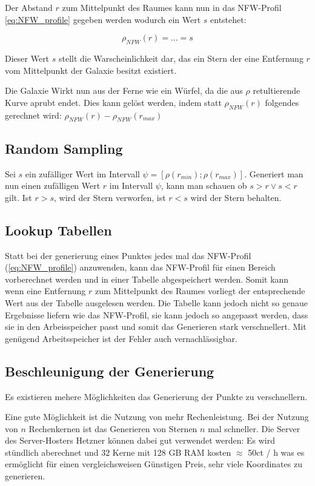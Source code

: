 \documentclass[a4paper, 10pt]{article}
\begin{document}
\begin{multicols*}{2}
Der Abstand \( r \) zum Mittelpunkt des Raumes kann nun in das NFW-Profil
\ref{eq:NFW_profile} gegeben werden wodurch ein Wert \( s \) entstehet:

\begin{equation}
\rho_{NFW}(r) = \dots = s
\end{equation}

Dieser Wert \( s \) stellt die Warscheinlichkeit dar, das ein Stern der
eine Entfernung \( r \) vom Mittelpunkt der Galaxie besitzt existiert.

Die Galaxie Wirkt nun aus der Ferne wie ein Würfel, da die aus \( \rho \)
retultierende Kurve aprubt endet. Dies kann gelöst werden, indem statt \(
\rho_{NFW}(r) \) folgendes gerechnet wird: \( \rho_{NFW}(r) -
\rho_{NFW}(r_{max}) \) 

\subsection{Random Sampling}
Sei \( s \) ein zufälliger Wert im Intervall \( \psi = [ \rho(r_{min}); \rho(r_{max}) ]
\).  Generiert man nun einen zufälligen Wert \( r \) im Intervall \( \psi \),
kann man schauen ob \( s > r \lor s < r \) gilt. Ist \( r > s \), wird der Stern verworfen,
ist \( r < s \) wird der Stern behalten.

\subsection{Lookup Tabellen}
Statt bei der generierung eines Punktes jedes mal das NFW-Profil
(\ref{eq:NFW_profile}) anzuwenden, kann das NFW-Profil für einen Bereich
vorberechnet werden und in einer Tabelle abgespeichert werden. Somit kann wenn
eine Entfernung \( r \) zum Mittelpunkt des Raumes vorliegt der entsprechende
Wert aus der Tabelle ausgelesen werden.  Die Tabelle kann jedoch nicht so
genaue Ergebnisse liefern wie das NFW-Profil, sie kann jedoch so angepasst
werden, dass sie in den Arbeisspeicher passt und somit das Generieren stark
verschnellert. Mit genügend Arbeitsspeicher ist der Fehler auch
vernachlässigbar.

\subsection{Beschleunigung der Generierung}
Es existieren mehere Möglichkeiten das Generierung der Punkte zu verschnellern.

Eine gute Möglichkeit ist die Nutzung von mehr Rechenleistung.  Bei der Nutzung
von \( n \) Rechenkernen ist das Generieren von Sternen \( n \) mal schneller.
Die Server des Server-Hosters Hetzner können dabei gut verwendet werden:
Es wird stündlich aberechnet und 32 Kerne mit 128 GB RAM kosten \( \approx \)
50ct / h was es ermöglicht für einen vergleichsweisen Günstigen Preis, sehr
viele Koordinates zu generieren.


\end{multicols*}
\end{document}
